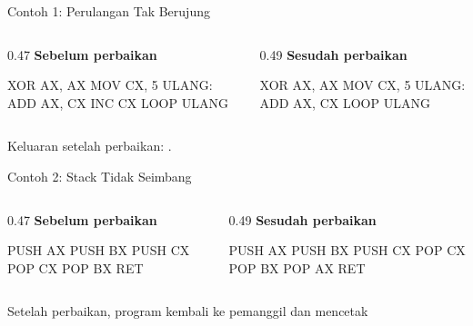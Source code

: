 \documentclass[aspectratio=169,11pt]{beamer}
\begin{document}
\begin{frame}[fragile]{Contoh 1: Perulangan Tak Berujung}
\begin{columns}[t]
\begin{column}{0.47\textwidth}
{\color{obeMaroon}\bfseries Sebelum perbaikan}\\[0.15em]
\begin{kodeasm}[numbers=none]
XOR AX, AX
MOV CX, 5
ULANG:
    ADD AX, CX
    INC CX
    LOOP ULANG
\end{kodeasm}
\end{column}
\begin{column}{0.49\textwidth}
{\color{obeTeal}\bfseries Sesudah perbaikan}\\[0.15em]
\begin{kodeasm}[numbers=none]
XOR AX, AX
MOV CX, 5
ULANG:
    ADD AX, CX
    LOOP ULANG
\end{kodeasm}
\end{column}
\end{columns}

\vspace{0.2em}
{\footnotesize\color{obeTeal}Keluaran setelah perbaikan:
.\par}
\end{frame}

\begin{frame}[fragile]{Contoh 2: Stack Tidak Seimbang}
\begin{columns}[t]
\begin{column}{0.47\textwidth}
{\color{obeMaroon}\bfseries Sebelum perbaikan}\\[0.15em]
\begin{kodeasm}[numbers=none]
PUSH AX
PUSH BX
PUSH CX
POP CX
POP BX
RET
\end{kodeasm}
\end{column}
\begin{column}{0.49\textwidth}
{\color{obeTeal}\bfseries Sesudah perbaikan}\\[0.15em]
\begin{kodeasm}[numbers=none]
PUSH AX
PUSH BX
PUSH CX
POP CX
POP BX
POP AX
RET
\end{kodeasm}
\end{column}
\end{columns}

\vspace{0.2em}
{\footnotesize\color{obeTeal}Setelah perbaikan, program kembali ke
pemanggil dan mencetak \par}
\end{frame}
\end{document}
